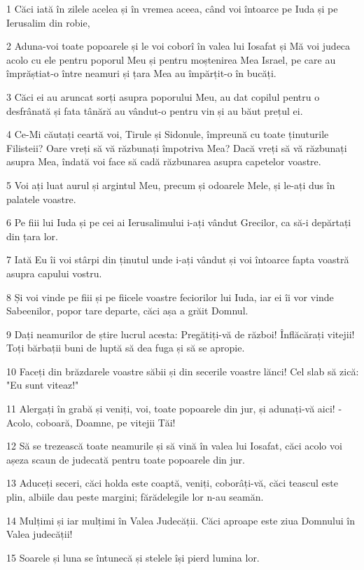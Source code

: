 \par 1 Căci iată în zilele acelea și în vremea aceea, când voi întoarce pe Iuda și pe Ierusalim din robie,
\par 2 Aduna-voi toate popoarele și le voi coborî în valea lui Iosafat și Mă voi judeca acolo cu ele pentru poporul Meu și pentru moștenirea Mea Israel, pe care au împrăștiat-o între neamuri și țara Mea au împărțit-o în bucăți.
\par 3 Căci ei au aruncat sorți asupra poporului Meu, au dat copilul pentru o desfrânată și fata tânără au vândut-o pentru vin și au băut prețul ei.
\par 4 Ce-Mi căutați ceartă voi, Tirule și Sidonule, împreună cu toate ținuturile Filisteii? Oare vreți să vă răzbunați împotriva Mea? Dacă vreți să vă răzbunați asupra Mea, îndată voi face să cadă răzbunarea asupra capetelor voastre.
\par 5 Voi ați luat aurul și argintul Meu, precum și odoarele Mele, și le-ați dus în palatele voastre.
\par 6 Pe fiii lui Iuda și pe cei ai Ierusalimului i-ați vândut Grecilor, ca să-i depărtați din țara lor.
\par 7 Iată Eu îi voi stârpi din ținutul unde i-ați vândut și voi întoarce fapta voastră asupra capului vostru.
\par 8 Și voi vinde pe fiii și pe fiicele voastre feciorilor lui Iuda, iar ei îi vor vinde Sabeenilor, popor tare departe, căci așa a grăit Domnul.
\par 9 Dați neamurilor de știre lucrul acesta: Pregătiți-vă de război! Înflăcărați vitejii! Toți bărbații buni de luptă să dea fuga și să se apropie.
\par 10 Faceți din brăzdarele voastre săbii și din secerile voastre lănci! Cel slab să zică: "Eu sunt viteaz!"
\par 11 Alergați în grabă și veniți, voi, toate popoarele din jur, și adunați-vă aici! - Acolo, coboară, Doamne, pe vitejii Tăi!
\par 12 Să se trezească toate neamurile și să vină în valea lui Iosafat, căci acolo voi așeza scaun de judecată pentru toate popoarele din jur.
\par 13 Aduceți seceri, căci holda este coaptă, veniți, coborâți-vă, căci teascul este plin, albiile dau peste margini; fărădelegile lor n-au seamăn.
\par 14 Mulțimi și iar mulțimi în Valea Judecății. Căci aproape este ziua Domnului în Valea judecății!
\par 15 Soarele și luna se întunecă și stelele își pierd lumina lor.
